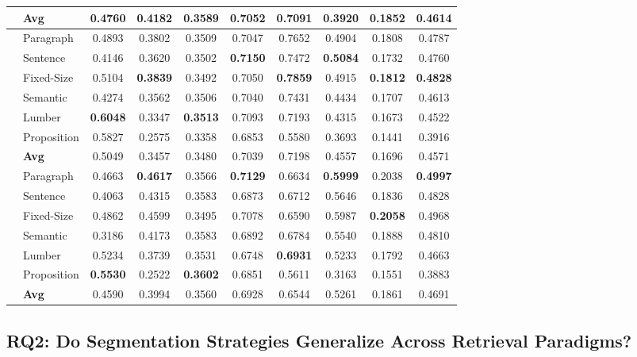 \begin{table}[htbp]
\begin{tabular}{llcccccccc}
		& \textbf{Avg} & 0.4760 & 0.4182 & 0.3589 & 0.7052 & 0.7091 & 0.3920 & 0.1852 & 0.4614 \\
		\midrule
		\multirow{6}{*}{\rotatebox{90}{\textbf{Nomic}}} & Paragraph & 0.4893 & 0.3802 & 0.3509 & 0.7047 & 0.7652 & 0.4904 & 0.1808 & 0.4787 \\
		& Sentence & 0.4146 & 0.3620 & 0.3502 & \textbf{0.7150} & 0.7472 & \textbf{0.5084} & 0.1732 & 0.4760 \\
		& Fixed-Size & 0.5104 & \textbf{0.3839} & 0.3492 & 0.7050 & \textbf{0.7859} & 0.4915 & \textbf{0.1812} & \textbf{0.4828} \\
		& Semantic & 0.4274 & 0.3562 & 0.3506 & 0.7040 & 0.7431 & 0.4434 & 0.1707 & 0.4613 \\
		& Lumber & \textbf{0.6048} & 0.3347 & \textbf{0.3513} & 0.7093 & 0.7193 & 0.4315 & 0.1673 & 0.4522 \\
		& Proposition & 0.5827 & 0.2575 & 0.3358 & 0.6853 & 0.5580 & 0.3693 & 0.1441 & 0.3916 \\
		& \textbf{Avg} & 0.5049 & 0.3457 & 0.3480 & 0.7039 & 0.7198 & 0.4557 & 0.1696 & 0.4571 \\
		\midrule
		\multirow{6}{*}{\rotatebox{90}{\textbf{E5-Large}}} & Paragraph & 0.4663 & \textbf{0.4617} & 0.3566 & \textbf{0.7129} & 0.6634 & \textbf{0.5999} & 0.2038 & \textbf{0.4997} \\
		& Sentence & 0.4063 & 0.4315 & 0.3583 & 0.6873 & 0.6712 & 0.5646 & 0.1836 & 0.4828 \\
		& Fixed-Size & 0.4862 & 0.4599 & 0.3495 & 0.7078 & 0.6590 & 0.5987 & \textbf{0.2058} & 0.4968 \\
		& Semantic & 0.3186 & 0.4173 & 0.3583 & 0.6892 & 0.6784 & 0.5540 & 0.1888 & 0.4810 \\
		& Lumber & 0.5234 & 0.3739 & 0.3531 & 0.6748 & \textbf{0.6931} & 0.5233 & 0.1792 & 0.4663 \\
		& Proposition & \textbf{0.5530} & 0.2522 & \textbf{0.3602} & 0.6851 & 0.5611 & 0.3163 & 0.1551 & 0.3883 \\
		& \textbf{Avg} & 0.4590 & 0.3994 & 0.3560 & 0.6928 & 0.6544 & 0.5261 & 0.1861 & 0.4691 \\
		\bottomrule
	\end{tabular}
\end{table}



\subsection{RQ2: Do Segmentation Strategies Generalize Across Retrieval Paradigms?}

